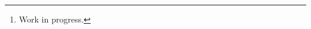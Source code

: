 

\maketitle

\begin{abstract} 

\noindent
We discuss Machine Learning on a high level.

  \footnote{Work in progress.}

\vspace{5mm}


\textbf{Keywords:} Machine Learning


\textbf{}

\end{abstract} 


\vfill

\clearpage

\newpage

\tableofcontents

\newpage

 
